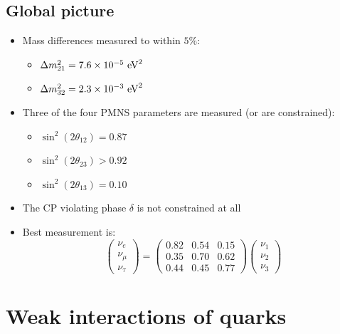 \subsection{Global picture}
\begin{itemize}
  \item Mass differences measured to within $5\%$:
  \begin{itemize}
    \item $\Delta m_{21}^2 = 7.6 \times 10^{-5}~\text{eV}^2$
    \item $\Delta m_{32}^2 = 2.3 \times 10^{-3}~\text{eV}^2$
  \end{itemize}
  \item Three of the four PMNS parameters are measured (or are constrained):
  \begin{itemize}
    \item $\sin^2(2\theta_{12}) = 0.87$
    \item $\sin^2(2\theta_{23}) > 0.92$
    \item $\sin^2(2\theta_{13}) = 0.10$
  \end{itemize}
  \item The CP violating phase $\delta$ is not constrained at all
  \item Best measurement is:
  \begin{equation}
    \begin{pmatrix} \nu_e \\ \nu_\mu \\ \nu_\tau \end{pmatrix} = \begin{pmatrix} 0.82 & 0.54 & 0.15 \\ 0.35 & 0.70 & 0.62 \\ 0.44 & 0.45 & 0.77 \end{pmatrix}\begin{pmatrix} \nu_1 \\ \nu_2 \\ \nu_3 \end{pmatrix}
  \end{equation}
\end{itemize}

\section{Weak interactions of quarks}
